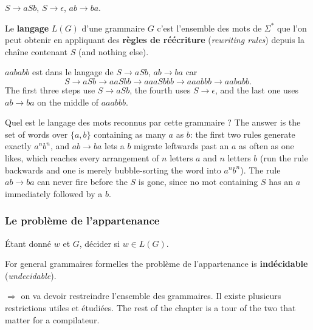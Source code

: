 \begin{example}
  $S \to aSb$, \quad $S \to \epsilon$, \quad $ab \to ba$.
\end{example}

\begin{definition}
  Le \textbf{langage} $L(G)$ d'une grammaire $G$ c'est l'ensemble des mots de
  $\Sigma^{*}$ que l'on peut obtenir en appliquant des \textbf{règles de
  réécriture} (\textit{rewriting rules}) depuis la chaîne contenant $S$ (and
  nothing else).
\end{definition}

\begin{example}
  $aababb$ est dans le langage de $S \to aSb$, $ab \to ba$ car
  \[
    S \to aSb \to aaSbb \to aaaSbbb \to aaabbb \to aababb .
  \]
  The first three steps use $S \to aSb$, the fourth uses $S \to \epsilon$, and
  the last one uses $ab \to ba$ on the middle of $aaabbb$.
\end{example}

\begin{remark}
  Quel est le langage des mots reconnus par cette grammaire ? The answer is the
  set of words over $\{a,b\}$ containing as many $a$ as
  $b$: the first two rules generate exactly $a^{n}b^{n}$, and $ab \to ba$ lets a
  $b$ migrate leftwards past an $a$ as often as one likes, which reaches every
  arrangement of $n$ letters $a$ and $n$ letters $b$ (run the rule backwards and
  one is merely bubble-sorting the word into $a^{n}b^{n}$). The rule
  $ab \to ba$ can never fire before the $S$ is gone, since no mot containing
  $S$ has an $a$ immediately followed by a $b$.
\end{remark}

\subsubsection{Le problème de l'appartenance}
\begin{problem}
  Étant donné $w$ et $G$, décider si $w \in L(G)$.
\end{problem}

\begin{theorem}
  For general grammaires formelles the problème de l'appartenance is
  \textbf{indécidable} (\textit{undecidable}).
\end{theorem}

\noindent $\Rightarrow$ on va devoir restreindre l'ensemble des grammaires. Il
existe plusieurs restrictions utiles et étudiées. The rest of the chapter is a
tour of the two that matter for a compilateur.

